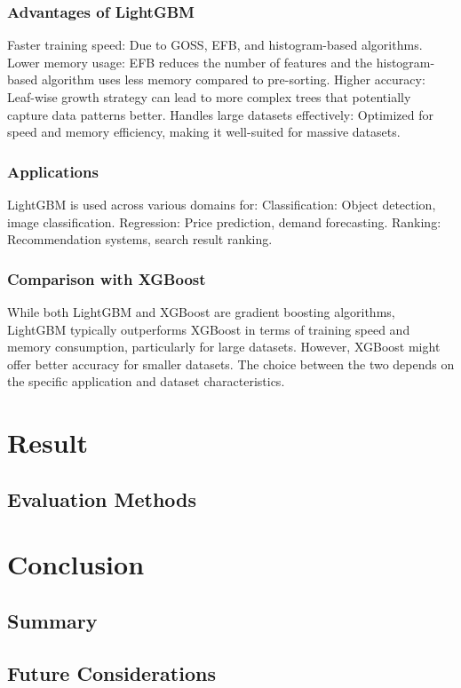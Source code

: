 \documentclass{ieeeojies}
\begin{document}
\subsubsection{Advantages of LightGBM}
Faster training speed: Due to GOSS, EFB, and histogram-based algorithms.
Lower memory usage: EFB reduces the number of features and the histogram-based algorithm uses less memory compared to pre-sorting.
Higher accuracy: Leaf-wise growth strategy can lead to more complex trees that potentially capture data patterns better.
Handles large datasets effectively: Optimized for speed and memory efficiency, making it well-suited for massive datasets.
\subsubsection{Applications}
LightGBM is used across various domains for:
Classification: Object detection, image classification.
Regression: Price prediction, demand forecasting.
Ranking: Recommendation systems, search result ranking.
\subsubsection{Comparison with XGBoost}
While both LightGBM and XGBoost are gradient boosting algorithms, LightGBM typically outperforms XGBoost in terms of training speed and memory consumption, particularly for large datasets. However, XGBoost might offer better accuracy for smaller datasets. The choice between the two depends on the specific application and dataset characteristics.

\section{Result}

\subsection{Evaluation Methods}

\section{Conclusion}

\subsection{Summary}

\subsection{Future Considerations}
\end{document}
